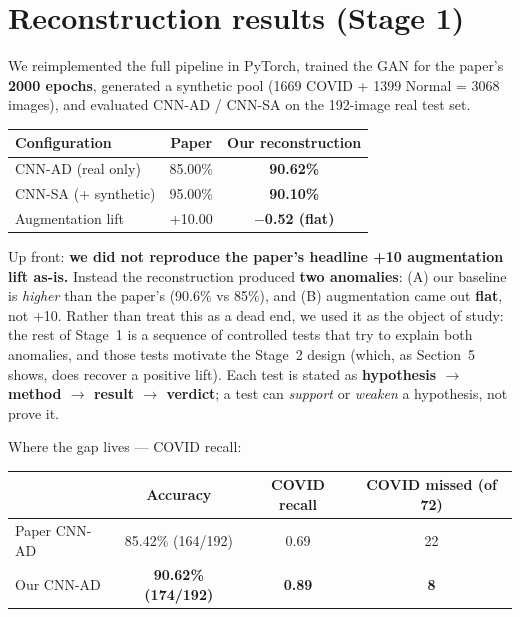 \documentclass[11pt]{article}
\begin{document}
\section{Reconstruction results (Stage 1)}
\label{sec:recon}

We reimplemented the full pipeline in PyTorch, trained the GAN for the paper's
\textbf{2000 epochs}, generated a synthetic pool (1669 COVID + 1399 Normal = 3068
images), and evaluated CNN-AD / CNN-SA on the 192-image real test set.

\begin{table}[htbp]
\centering
\begin{tabular}{@{}lcc@{}}
\toprule
\textbf{Configuration} & \textbf{Paper} & \textbf{Our reconstruction} \\
\midrule
CNN-AD (real only)   & 85.00\% & \textbf{90.62\%} \\
CNN-SA (+ synthetic) & 95.00\% & \textbf{90.10\%} \\
Augmentation lift    & +10.00  & \textbf{$-$0.52 (flat)} \\
\bottomrule
\end{tabular}
\end{table}

Up front: \textbf{we did not reproduce the paper's headline +10 augmentation lift
as-is.} Instead the reconstruction produced \textbf{two anomalies}: (A) our
baseline is \emph{higher} than the paper's (90.6\% vs 85\%), and (B) augmentation
came out \textbf{flat}, not +10. Rather than treat this as a dead end, we used it
as the object of study: the rest of Stage~1 is a sequence of controlled tests that
try to explain both anomalies, and those tests motivate the Stage~2 design (which,
as Section~5 shows, does recover a positive lift). Each test is stated as
\textbf{hypothesis $\rightarrow$ method $\rightarrow$ result $\rightarrow$
verdict}; a test can \emph{support} or \emph{weaken} a hypothesis, not prove it.

Where the gap lives --- COVID recall:

\begin{table}[htbp]
\centering
\begin{tabular}{@{}lccc@{}}
\toprule
 & \textbf{Accuracy} & \textbf{COVID recall} & \textbf{COVID missed (of 72)} \\
\midrule
Paper CNN-AD & 85.42\% (164/192) & 0.69 & 22 \\
Our CNN-AD   & \textbf{90.62\% (174/192)} & \textbf{0.89} & \textbf{8} \\
\bottomrule
\end{tabular}
\end{table}
\end{document}
